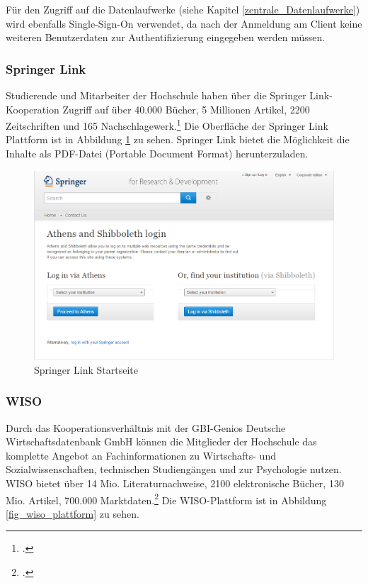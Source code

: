 Für den Zugriff auf die Datenlaufwerke (siehe Kapitel \ref{zentrale_Datenlaufwerke}) wird ebenfalls Single-Sign-On verwendet, da nach der Anmeldung am Client keine weiteren Benutzerdaten zur Authentifizierung eingegeben werden müssen. 
\newpage
\subsubsection{Springer Link}
Studierende und Mitarbeiter der Hochschule haben über die Springer Link-Kooperation Zugriff auf über 40.000 Bücher, 5 Millionen Artikel, 2200 Zeitschriften und 165 Nachschlagewerk.\footcite{springer_springerlink_faq_2015} Die Oberfläche der Springer Link Plattform ist in Abbildung \ref{fig_springerlink_startseite} zu sehen. Springer Link bietet die Möglichkeit die Inhalte als PDF-Datei (Portable Document Format) herunterzuladen. 

\begin{figure}[h]
	\centering
	\includegraphics[width=\textwidth]{kapitel/gruppe2/bilder/springerlink_startseite}
	\caption{Springer Link Startseite \protect\footnotemark}
	\label{fig_springerlink_startseite}
\end{figure}
\clearpage
\subsubsection{WISO}
Durch das Kooperationsverhältnis mit der GBI-Genios Deutsche Wirtschaftsdatenbank GmbH können die Mitglieder der Hochschule das komplette Angebot an Fachinformationen zu Wirtschafts- und Sozialwissenschaften, technischen Studiengängen und zur Psychologie  nutzen. WISO bietet über 14 Mio. Literaturnachweise, 2100 elektronische Bücher, 130 Mio. Artikel, 700.000 Marktdaten.\footcite{gbi_genios_uber_wiso_2015} Die WISO-Plattform ist in Abbildung \ref{fig_wiso_plattform} zu sehen.

